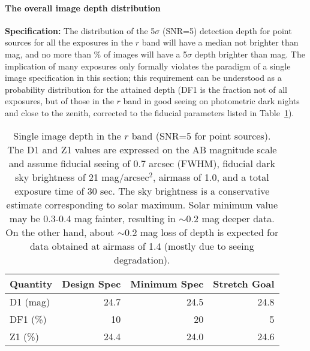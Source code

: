 \paragraph{The overall image depth distribution\\}
\label{singleimagedepth}


{\bf Specification:} The distribution of the 5$\sigma$ (SNR=5) detection
depth for point sources for all the exposures in the $r$ band will have a
median not brighter than
mag, and no more than
\% of
images will have a 5$\sigma$ depth brighter than
mag. The implication
of many exposures only formally violates the paradigm of a single image
specification in this section; this requirement can be understood as a
probability distribution for the attained depth (DF1 is the fraction
not of all exposures, but of those in the $r$ band in good seeing on photometric
dark nights and close to the zenith, corrected to the fiducial parameters
listed in Table~\ref{ImageDtable}).

\begin{table}[h]
\label{tsi}
\begin{tabular}{|l|r|r|r|}
\hline
Quantity        & Design Spec & Minimum Spec & Stretch Goal   \\
\hline
      D1 (mag)  &    24.7     &     24.5    &     24.8        \\
      DF1 (\%)  &    10       &      20     &       5         \\
      Z1  (\%)  &    24.4     &     24.0    &     24.6        \\
\hline
\end{tabular}
\caption{Single image depth in the $r$ band (SNR=5 for point sources).
The D1 and Z1 values are expressed on the AB magnitude scale
and assume 
 fiducial seeing of 0.7 arcsec (FWHM), fiducial dark sky brightness of
21 mag/arcsec$^2$, airmass of 1.0, and a total exposure time of 30 sec.
The sky brightness is a conservative estimate corresponding
to solar maximum. Solar minimum value may be 0.3-0.4 mag fainter, resulting
in $\sim$0.2 mag deeper data. On the other hand, about  $\sim$0.2 mag loss
of depth is expected for data obtained at airmass of 1.4 (mostly due to
seeing degradation). }
\label{ImageDtable}
\end{table}


